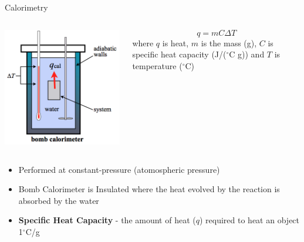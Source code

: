 \documentclass[11pt]{beamer}
\begin{document}
\begin{frame}{Calorimetry}
  \begin{columns}
    \begin{center}
      \includegraphics[scale=0.3]{bomb_calor}
    \end{center}
    \begin{equation}
      q = mC\Delta T
    \end{equation}
    where $q$ is heat, $m$ is the mass (g), $C$ is
    specific heat capacity (J/($^\circ$C g)) and $T$ is
    temperature ($^\circ$C)
  \end{columns}
  
  \begin{itemize}
  \item Performed at constant-pressure (atomospheric pressure)
  \item Bomb Calorimeter is Insulated where the heat evolved by the reaction
    is absorbed by the water
  \item \textbf{Specific Heat Capacity} - the amount of heat ($q$)
    required to heat an object 1$^\circ$C/g
  \end{itemize}
\end{frame}
\end{document}
